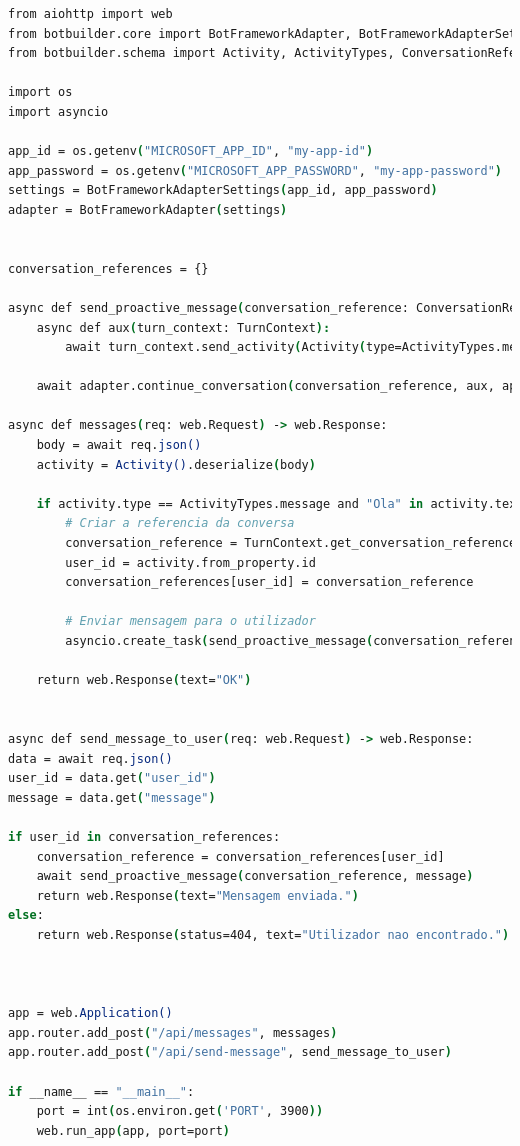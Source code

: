 \begin{lstlisting}[language=csh, caption={Envio de notificação via Microsoft Teams}]
from aiohttp import web
from botbuilder.core import BotFrameworkAdapter, BotFrameworkAdapterSettings, TurnContext
from botbuilder.schema import Activity, ActivityTypes, ConversationReference

import os
import asyncio

app_id = os.getenv("MICROSOFT_APP_ID", "my-app-id")
app_password = os.getenv("MICROSOFT_APP_PASSWORD", "my-app-password")
settings = BotFrameworkAdapterSettings(app_id, app_password)
adapter = BotFrameworkAdapter(settings)


conversation_references = {}

async def send_proactive_message(conversation_reference: ConversationReference, message: str):
    async def aux(turn_context: TurnContext):
        await turn_context.send_activity(Activity(type=ActivityTypes.message, text=message))

    await adapter.continue_conversation(conversation_reference, aux, app_id)

async def messages(req: web.Request) -> web.Response:
    body = await req.json()
    activity = Activity().deserialize(body)

    if activity.type == ActivityTypes.message and "Ola" in activity.text:
        # Criar a referencia da conversa
        conversation_reference = TurnContext.get_conversation_reference(activity)
        user_id = activity.from_property.id
        conversation_references[user_id] = conversation_reference

        # Enviar mensagem para o utilizador
        asyncio.create_task(send_proactive_message(conversation_reference, "Ola! o seu pedido foi concluido."))

    return web.Response(text="OK")


async def send_message_to_user(req: web.Request) -> web.Response:
data = await req.json()
user_id = data.get("user_id")
message = data.get("message")

if user_id in conversation_references:
    conversation_reference = conversation_references[user_id]
    await send_proactive_message(conversation_reference, message)
    return web.Response(text="Mensagem enviada.")
else:
    return web.Response(status=404, text="Utilizador nao encontrado.")



app = web.Application()
app.router.add_post("/api/messages", messages)
app.router.add_post("/api/send-message", send_message_to_user)

if __name__ == "__main__":
    port = int(os.environ.get('PORT', 3900))
    web.run_app(app, port=port)

\end{lstlisting}

